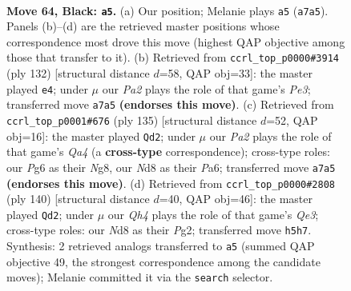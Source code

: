 \documentclass[11pt]{article}
\begin{document}
\clearpage

\begin{figure}[p]\centering
\begin{subfigure}{0.46\textwidth}\centering
\resizebox{\linewidth}{!}{%
\newchessgame
\chessboard[
  setfen={3n4/p2k2p1/1pp3p1/2p4q/8/Q1P5/KP6/8 b - - 5 64},
  showmover=false,
  pgfstyle=straightmove, color=movearrow, markmove={a7-a5}
]}
\caption{}
\end{subfigure}\hfill
\begin{subfigure}{0.46\textwidth}\centering
\resizebox{\linewidth}{!}{%
\newchessgame
\chessboard[
  setfen={6k1/4q2p/6pP/8/p2Q1P1P/4P1K1/8/8 w - - 1 67},
  showmover=false,
  pgfstyle=straightmove, color=movearrow, markmove={e3-e4}
]}
\caption{}
\end{subfigure}
\\[4pt]
\begin{subfigure}{0.46\textwidth}\centering
\resizebox{\linewidth}{!}{%
\newchessgame
\chessboard[
  setfen={6n1/7k/p5p1/qp1PQ2p/2p2P2/6PP/6NK/8 b - - 0 68},
  showmover=false,
  pgfstyle=straightmove, color=movearrow, markmove={a5-d2}
]}
\caption{}
\end{subfigure}\hfill
\begin{subfigure}{0.46\textwidth}\centering
\resizebox{\linewidth}{!}{%
\newchessgame
\chessboard[
  setfen={8/3k1p2/2pq4/7p/3P1Pp1/4Q1P1/6PK/8 w - - 11 71},
  showmover=false,
  pgfstyle=straightmove, color=movearrow, markmove={e3-d2}
]}
\caption{}
\end{subfigure}
\caption{\textbf{Move 64, Black: \texttt{a5}.} (a) Our position; Melanie plays \texttt{a5} (\texttt{a7a5}). Panels (b)--(d) are the retrieved master positions whose correspondence most drove this move (highest QAP objective among those that transfer to it). (b) Retrieved from \texttt{ccrl\_top\_p0000\#3914} (ply 132) [structural distance $d$=58, QAP obj=33]: the master played \texttt{e4}; under $\mu$ our \emph{Pa2} plays the role of that game's \emph{Pe3}; transferred move \texttt{a7a5} \textbf{(endorses this move)}. (c) Retrieved from \texttt{ccrl\_top\_p0001\#676} (ply 135) [structural distance $d$=52, QAP obj=16]: the master played \texttt{Qd2}; under $\mu$ our \emph{Pa2} plays the role of that game's \emph{Qa4} (a \textbf{cross-type} correspondence); cross-type roles: our \emph{P}g6 as their \emph{N}g8, our \emph{N}d8 as their \emph{P}a6; transferred move \texttt{a7a5} \textbf{(endorses this move)}. (d) Retrieved from \texttt{ccrl\_top\_p0000\#2808} (ply 140) [structural distance $d$=40, QAP obj=46]: the master played \texttt{Qd2}; under $\mu$ our \emph{Qh4} plays the role of that game's \emph{Qe3}; cross-type roles: our \emph{N}d8 as their \emph{P}g2; transferred move \texttt{h5h7}. Synthesis: 2 retrieved analogs transferred to \texttt{a5} (summed QAP objective 49, the strongest correspondence among the candidate moves); Melanie committed it via the \texttt{search} selector.}
\label{fig:thought-m127}
\end{figure}
\end{document}
